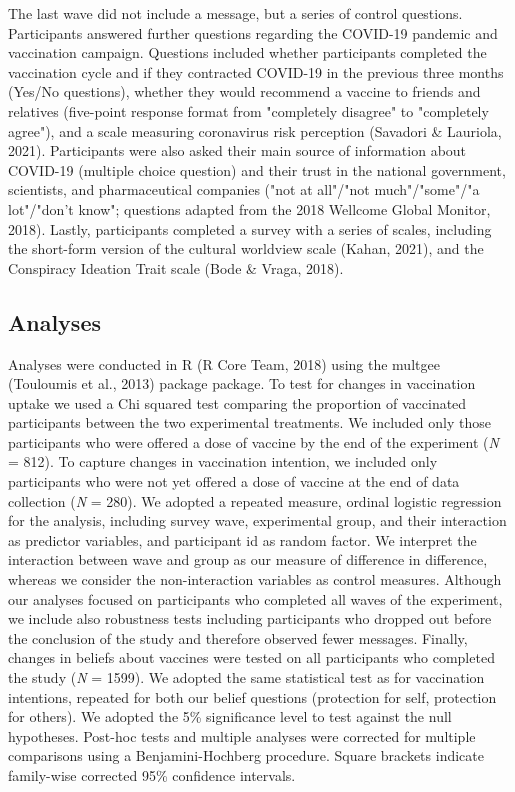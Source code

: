 \documentclass[authordate, empirical]{jote-new-article}
\begin{document}
The last wave did not include a message, but a series of control questions. Participants answered further questions regarding the COVID-19 pandemic and vaccination campaign. Questions included whether participants completed the vaccination cycle and if they contracted COVID-19 in the previous three months (Yes/No questions), whether they would recommend a vaccine to friends and relatives (five-point response format from "completely disagree" to "completely agree"), and a scale measuring coronavirus risk perception (Savadori \& Lauriola, 2021). Participants were also asked their main source of information about COVID-19 (multiple choice question) and their trust in the national government, scientists, and pharmaceutical companies ("not at all"/"not much"/"some"/"a lot"/"don't know"; questions adapted from the 2018 Wellcome Global Monitor, 2018). Lastly, participants completed a survey with a series of scales, including the short-form version of the cultural worldview scale (Kahan, 2021), and the Conspiracy Ideation Trait scale (Bode \& Vraga, 2018).



\subsection{Analyses}



Analyses were conducted in R (R Core Team, 2018) using the multgee (Touloumis et al., 2013) package package. To test for changes in vaccination uptake we used a Chi squared test comparing the proportion of vaccinated participants between the two experimental treatments. We included only those participants who were offered a dose of vaccine by the end of the experiment (\emph{N }= 812). To capture changes in vaccination intention, we included only participants who were not yet offered a dose of vaccine at the end of data collection (\emph{N }= 280). We adopted a repeated measure, ordinal logistic regression for the analysis, including survey wave, experimental group, and their interaction as predictor variables, and participant id as random factor. We interpret the interaction between wave and group as our measure of difference in difference, whereas we consider the non-interaction variables as control measures. Although our analyses focused on participants who completed all waves of the experiment, we include also robustness tests including participants who dropped out before the conclusion of the study and therefore observed fewer messages. Finally, changes in beliefs about vaccines were tested on all participants who completed the study (\emph{N }= 1599). We adopted the same statistical test as for vaccination intentions, repeated for both our belief questions (protection for self, protection for others). We adopted the 5\% significance level to test against the null hypotheses. Post-hoc tests and multiple analyses were corrected for multiple comparisons using a Benjamini-Hochberg procedure. Square brackets indicate family-wise corrected 95\% confidence intervals.
\end{document}
